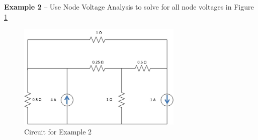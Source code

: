\documentclass{handout}
\begin{document}
\textbf{Example 2} -- Use Node Voltage Analysis to solve for all node voltages in Figure \ref{fig: NodalAnalysisEx2}
\begin{figure} [h t b]
\centering
\includegraphics[width=0.7\textwidth]{NodalAnalysisEx2.jpg}
\caption{Circuit for Example 2}
\label{fig: NodalAnalysisEx2}
\end{figure}
\end{document}
